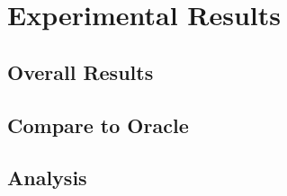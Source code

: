 \section{Experimental Results}


\subsection{Overall Results\label{sec:overall_result}}





\subsection{Compare to Oracle}


\subsection{Analysis}
